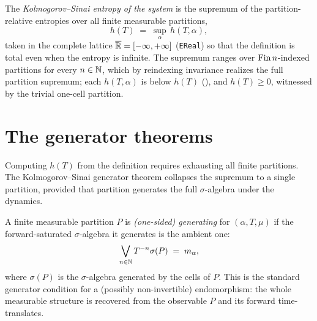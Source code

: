\begin{definition}\label{ksEntropy}
  \leanok
  The \emph{Kolmogorov--Sinai entropy of the system} is the supremum of the partition-relative
  entropies over all finite measurable partitions,
  \[
    h(T) \;=\; \sup_{\alpha}\, h(T,\alpha),
  \]
  taken in the complete lattice \(\overline{\mathbb{R}}=[-\infty,+\infty]\) (\texttt{EReal}) so that the
  definition is total even when the entropy is infinite. The supremum ranges over
  \(\operatorname{Fin} n\)-indexed partitions for every \(n\in\mathbb{N}\), which by reindexing invariance realizes the
  full partition supremum; each \(h(T,\alpha)\) is below \(h(T)\)
  (), and \(h(T)\ge 0\), witnessed by the trivial
  one-cell partition.
\end{definition}

\section{The generator theorems}

Computing \(h(T)\) from the definition requires exhausting all finite partitions. The
Kolmogorov--Sinai generator theorem collapses the supremum to a single partition, provided that
partition generates the full \(\sigma\)-algebra under the dynamics.

\begin{definition}\label{IsGenerating}
  \leanok
  A finite measurable partition \(P\) is \emph{(one-sided) generating} for \((\alpha,T,\mu)\) if
  the forward-saturated \(\sigma\)-algebra it generates is the ambient one:
  \[
    \bigvee_{n\in\mathbb{N}} T^{-n}\sigma(P) \;=\; m_\alpha,
  \]
  where \(\sigma(P)\) is the \(\sigma\)-algebra generated by the cells of \(P\). This is the
  standard generator condition for a (possibly non-invertible) endomorphism: the whole measurable
  structure is recovered from the observable \(P\) and its forward time-translates.
\end{definition}

